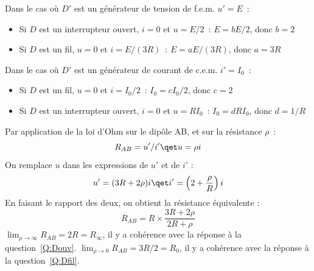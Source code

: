 \documentclass[a4paper, 10pt, garamond, oneside]{book}
\begin{document}
{\begin{enumerate}
		 Dans le cas où $D'$ est un générateur de tension de f.e.m. $u'=E$~:
		\begin{itemize}
			\item Si $D$ est un interrupteur ouvert, $i=0$ et $u=E/2$~:
			      $E=bE/2$, donc $\boxed{b=2}$
			\item Si $D$ est un fil, $u=0$ et $i=E/(3R)$~: $E=aE/(3R)$, donc
			      $\boxed{a=3R}$
		\end{itemize}
		Dans le cas où $D'$ est un générateur de courant de c.e.m. $i'=I_0$~:
		\begin{itemize}
			\item Si $D$ est un fil, $u=0$ et $i=I_0/2$~: $I_0=cI_0/2$,
			      donc $\boxed{c=2}$
			\item Si $D$ est un interrupteur ouvert, $i=0$ et $u=RI_0$~:
			      $I_0=dRI_0$, donc $\boxed{d=1/R}$
		\end{itemize}
		 Par application de la loi d'Ohm sur le dipôle AB, et sur la
		résistance
		$\rho$~:
		\[
			R_{AB}=u'/i'
			\qet
			u=\rho i
		\]
		On remplace $u$ dans les expressions de $u'$ et de $i'$ :
		\[
			u'=(3R+2\rho)i
			\qet
			i'=\left (2+\frac{\rho}{R}\right )i
		\]
		En faisant le rapport des deux, on obtient la résistance équivalente :
		\[
			\boxed{R_{AB}=R\times \frac{3R+2\rho}{2R+\rho}}
		\]
		 $\lim_{\rho\rightarrow \infty }R_{AB}=2R=R_\infty$, il y a cohérence
		avec la réponse à la question~\ref{Q:Douv}.
		 $\lim_{\rho\rightarrow 0}R_{AB}=3R/2=R_0$, il y a cohérence avec la
		réponse à la question~\ref{Q:Dfil}.
	\end{enumerate}
}

\newpage

\end{document}
